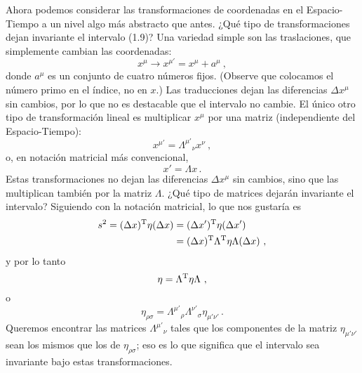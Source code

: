 \documentclass[11pt,b5paper,openany,twoside]{book}
\begin{document}
Ahora podemos considerar las transformaciones de coordenadas en el Espacio-Tiempo a un nivel algo más abstracto que antes.
¿Qué tipo de transformaciones dejan invariante el intervalo (1.9)? Una variedad simple son las traslaciones, que simplemente cambian las coordenadas:
\begin{equation}
x^\mu \rightarrow x^{\mu'} = x^\mu + a^\mu\ ,\label{1.10}
\end{equation}
donde $a^\mu$ es un conjunto de cuatro números fijos.
(Observe que colocamos el número primo en el índice, no en $x$.)
Las traducciones dejan las diferencias $\Delta x^\mu$ sin cambios, por lo que no es destacable que el intervalo no cambie.
El único otro tipo de transformación lineal es multiplicar $x^\mu$ por una matriz (independiente del Espacio-Tiempo):
\begin{equation}
x^{\mu'} = \Lambda^{\mu'}{}_\nu x^\nu\ , \label{1.11}
\end{equation}
o, en notación matricial más convencional,
\begin{equation}
x' = \Lambda x\,.\label{1.12}
\end{equation}
Estas transformaciones no dejan las diferencias $\Delta x^\mu$ sin cambios, sino que las multiplican también por la matriz $\Lambda$.
¿Qué tipo de matrices dejarán invariante el intervalo? Siguiendo con la notación matricial, lo que nos gustaría es
\begin{align}
s^2 = (\Delta x)^{\rm T} \eta (\Delta x)
& = (\Delta x')^{\rm T} \eta (\Delta x')\nonumber \\
& = (\Delta x)^{\rm T} \Lambda^{\rm T} \eta \Lambda (\Delta x)\ ,
\label{1.13}
\end{align}
y por lo tanto
\begin{equation}
\eta = \Lambda^{\rm T} \eta \Lambda \ ,\label{1.14}
\end{equation}
o
\begin{equation}
\eta_{\rho\sigma} = \Lambda^{\mu'}{}_{\rho}\Lambda^{\nu'}{}_{\sigma}
\eta_{\mu'\nu'}\,. \label{1.15}
\end{equation}
Queremos encontrar las matrices $\Lambda^{\mu'}{}_\nu$ tales que los componentes de la matriz $\eta_{\mu'\nu'}$ sean los mismos que los de $\eta_{\rho\sigma}$; eso es lo que significa que el intervalo sea invariante bajo estas transformaciones.
\end{document}

